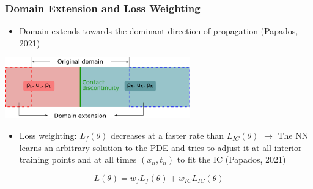 \documentclass[aspectratio=169]{beamer}
\begin{document}
%	
%				
%	
%	


\begin{frame}\frametitle{Domain Extension and Loss Weighting}
	\begin{itemize}
		\item Domain extends towards the dominant direction of propagation \tiny (Papados, 2021) 
	\end{itemize}
		
	\begin{center}
		\includegraphics[width=0.6\textwidth]{Figures/domain_extension.pdf}
	\end{center}
	
	\begin{itemize}
		\item Loss weighting: $L_f(\theta)$ decreases at a faster rate than $L_{IC}(\theta)$ $\rightarrow$ The NN learns an arbitrary solution to the PDE and tries to adjust it at all interior training points and at all times $(x_n, t_n)$ to fit the IC \tiny (Papados, 2021)
	\end{itemize}
	
	\begin{equation*}
		L(\theta) = w_f L_f (\theta) + w_{IC} L_{IC} (\theta)
	\end{equation*}
	
	
\end{frame}
\end{document}

